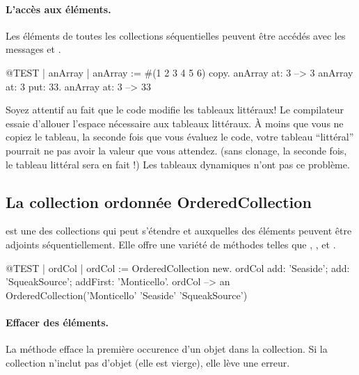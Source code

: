 \documentclass[a4paper,10pt,twoside]{book}
\begin{document}
\paragraph{L'acc\`es aux \'el\'ements.}
Les \'el\'ements de toutes les collections s\'equentielles peuvent
\^etre acc\'ed\'es avec les messages  et
 .

\begin{code}{@TEST | anArray |}
anArray := #(1 2 3 4 5 6) copy.
anArray at: 3 --> 3
anArray at: 3 put: 33.
anArray at: 3 --> 33
\end{code}

\noindent
Soyez attentif au fait que le code modifie les tableaux litt\'eraux!
Le compilateur essaie d'allouer l'espace n\'ecessaire aux tableaux litt\'eraux.
\`A moins que vous ne copiez le tableau, la seconde fois que vous \'evaluez
le code, votre tableau ``litt\'eral'' pourrait ne pas avoir la valeur que vous
attendez.
(sans clonage, la seconde fois, le tableau litt\'eral  sera en fait !)
Les tableaux dynamiques n'ont pas ce probl\`eme.

\subsection{La collection ordonn\'ee OrderedCollection}
 est une des collections qui peut s'\'etendre
et auxquelles des \'el\'ements peuvent \^etre adjoints s\'equentiellement.
Elle offre une vari\'et\'e de m\'ethodes telles que , ,  et .

\begin{code}{@TEST | ordCol |}
ordCol := OrderedCollection new.
ordCol add: 'Seaside'; add: 'SqueakSource'; addFirst: 'Monticello'.
ordCol --> an OrderedCollection('Monticello' 'Seaside' 'SqueakSource')
\end{code}

\paragraph{Effacer des \'el\'ements.} La m\'ethode   efface la premi\`ere occurence d'un objet dans la collection. Si la collection n'inclut pas d'objet (\cad elle est vierge), elle
l\`eve une erreur.
\end{document}
